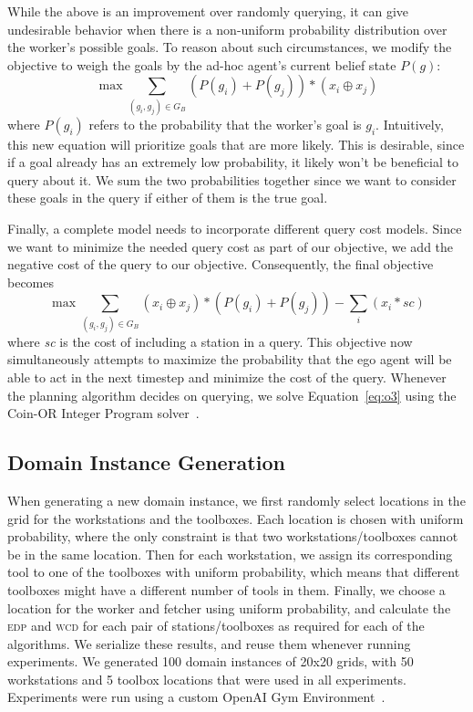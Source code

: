 \documentclass[letterpaper]{article}
\begin{document}
While the above is an improvement over randomly querying, it can give undesirable behavior when there is a non-uniform probability distribution over the worker's possible goals.
To reason about such circumstances, we modify the objective to weigh the goals by the ad-hoc agent's current belief state $P(g)$:
\begin{equation}
    \max\sum\limits_{(g_i, g_j) \in G_B}(P(g_i) + P(g_j))*(x_i \oplus x_j)
      \label{eq:o2}
\end{equation}
where $P(g_i)$ refers to the probability that the worker's goal is $g_i$. 
Intuitively, this new equation will prioritize goals that are more likely. This is desirable, since if a goal already has an extremely low probability, it likely won't be beneficial to query about it. We sum the two probabilities together since we want to consider these goals in the query if either of them is the true goal.

Finally, a complete model needs to incorporate different query cost models. Since we want to minimize the needed query cost as part of our objective, we add the negative cost of the query to our objective. Consequently, the final objective becomes
\begin{equation}
    \max\sum\limits_{(g_i,g_j) \in G_B}(x_i \oplus x_j)*(P(g_i) + P(g_j)) - \sum\limits_i(x_i*\textit{sc})
      \label{eq:o3}
\end{equation}
where \textit{sc} is the cost of including a station in a query. This objective now simultaneously attempts to maximize the probability that the ego agent will be able to act in the next timestep and minimize the cost of the query. Whenever the planning algorithm decides on querying, we solve Equation~\ref{eq:o3} using the Coin-OR Integer Program solver~\cite{john_forrest_2018_1317566}.

\subsection{Domain Instance Generation}
When generating a new domain instance, we first randomly select locations in the grid for the workstations and the toolboxes. Each location is chosen with uniform probability, where the only constraint is that two workstations/toolboxes cannot be in the same location. Then for each workstation, we assign its corresponding tool to one of the toolboxes with uniform probability, which means that different toolboxes might have a different number of tools in them. Finally, we choose a location for the worker and fetcher using uniform probability, and calculate the \textsc{edp} and \textsc{wcd} for each pair of stations/toolboxes as required for each of the algorithms. We serialize these results, and reuse them whenever running experiments. We generated 100 domain instances of 20x20 grids, with 50 workstations and 5 toolbox locations that were used in all experiments. Experiments were run using a custom OpenAI Gym Environment~\cite{openai_gym}.
\end{document}
